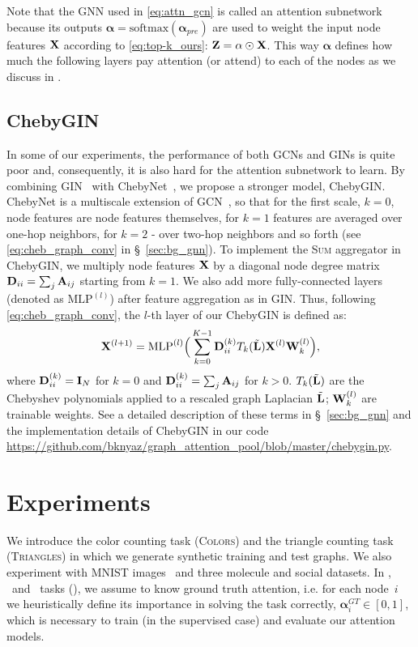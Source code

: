 Note that the GNN used in \eqref{eq:attn_gcn} is called an attention subnetwork because its outputs $\mathbf{\alpha} = \text{softmax}(\mathbf{\alpha}_{pre})$ are used to weight the input node features $\mathbf{X}$ according to \eqref{eq:top-k_ours}: $\mathbf{Z} = \mathbf{\alpha} \odot \mathbf{X}$. This way $\mathbf{\alpha}$ defines how much the following layers pay attention (or attend) to each of the nodes as we discuss in \secref{\ref{sec:attn_intro}}.

\subsection{ChebyGIN}

In some of our experiments, the performance of both GCNs and GINs is quite poor and, consequently, it is also hard for the attention subnetwork to learn. By combining GIN~\citep{xu2018powerful} with ChebyNet~\citep{defferrard2016convolutional}, we propose a stronger model, ChebyGIN.
ChebyNet is a multiscale extension of GCN~\citep{kipf2016semi}, so that for the first scale, $k=0$, node features are node features themselves, for $k=1$ features are averaged over one-hop neighbors, for $k=2$ - over two-hop neighbors and so forth (see \eqref{eq:cheb_graph_conv} in \S~\ref{sec:bg_gnn}).
To implement the \textsc{Sum} aggregator in ChebyGIN, we multiply node features $\mathbf{X}$ by a diagonal node degree matrix $\mathbf{D}_{ii}=\sum_j \mathbf{A}_{ij}$ starting from $k=1$. We also add more fully-connected layers (denoted as $\text{MLP}^{(l)}$) after feature aggregation as in GIN. Thus, following \eqref{eq:cheb_graph_conv}, the $l$-th layer of our ChebyGIN is defined as:
%
\begin{equation}
\label{eq:chebygin}
\mathbf{X}^{(l+1)} = \text{MLP}^{(l)} \Big(\sum^{K-1}_{k=0} \mathbf{D}_{ii}^{(k)} T_k(\tilde{\mathbf{L}}) \mathbf{X}^{(l)} \mathbf{W}^{(l)}_k \Big),
\end{equation}
%
\noindent where $\mathbf{D}_{ii}^{(k)} = \mathbf{I}_N$ for $k=0$ and $\mathbf{D}_{ii}^{(k)} = \sum_j \mathbf{A}_{ij}$ for $k > 0$. $T_k(\tilde{\mathbf{L}})$ are the Chebyshev polynomials applied to a rescaled graph Laplacian $\tilde{\mathbf{L}}$; $\mathbf{W}^{(l)}_k$ are trainable weights. See a detailed description of these terms in \S~\ref{sec:bg_gnn} and the implementation details of ChebyGIN in our code \url{https://github.com/bknyaz/graph_attention_pool/blob/master/chebygin.py}.

\section{Experiments}
\label{sec:exper}
We introduce the color counting task (\textsc{Colors}) and the triangle counting task (\textsc{Triangles}) in which we generate synthetic training and test graphs. We also experiment with MNIST images~\citep{lecun1998gradient} and three molecule and social datasets. In , \tri~and \mnistfull~tasks (\fig{\ref{fig:tasks}}), we assume to know ground truth attention, i.e. for each node~$i$ we heuristically define its importance in solving the task correctly, $\mathbf{\alpha}_i^{GT} \in [0,1]$, which is necessary to train (in the supervised case) and evaluate our attention models.


